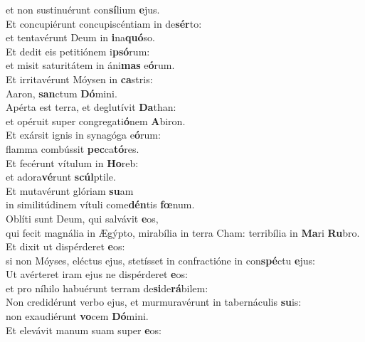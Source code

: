 \evenverse et non sustinuérunt con\textbf{sí}lium \textbf{e}jus.\\
\oddverse Et concupiérunt concupiscéntiam in de\textbf{sér}to:~\*\\
\oddverse et tentavérunt Deum in \textbf{i}na\textbf{quó}so.\\
\evenverse Et dedit eis petitiónem i\textbf{psó}rum:~\*\\
\evenverse et misit saturitátem in áni\textbf{mas} e\textbf{ó}rum.\\
\oddverse Et irritavérunt Móysen in \textbf{ca}stris:~\*\\
\oddverse Aaron, \textbf{san}ctum \textbf{Dó}mini.\\
\evenverse Apérta est terra, et deglutívit \textbf{Da}than:~\*\\
\evenverse et opéruit super congregati\textbf{ó}nem \textbf{A}biron.\\
\oddverse Et exársit ignis in synagóga e\textbf{ó}rum:~\*\\
\oddverse flamma combússit \textbf{pec}ca\textbf{tó}res.\\
\evenverse Et fecérunt vítulum in \textbf{Ho}reb:~\*\\
\evenverse et adora\textbf{vé}runt \textbf{scúl}ptile.\\
\oddverse Et mutavérunt glóriam \textbf{su}am~\*\\
\oddverse in similitúdinem vítuli come\textbf{dén}tis \textbf{fœ}num.\\
\evenverse Oblíti sunt Deum, qui salvávit \textbf{e}os,~\*\\
\evenverse qui fecit magnália in Ægýpto, mirabília in terra Cham: terribília in \textbf{Ma}ri \textbf{Ru}bro.\\
\oddverse Et dixit ut dispérderet \textbf{e}os:~\*\\
\oddverse si non Móyses, eléctus ejus, stetísset in confractióne in con\textbf{spé}ctu \textbf{e}jus:\\
\evenverse Ut avérteret iram ejus ne dispérderet \textbf{e}os:~\*\\
\evenverse et pro níhilo habuérunt terram de\textbf{si}de\textbf{rá}bilem:\\
\oddverse Non credidérunt verbo ejus, et murmuravérunt in tabernáculis \textbf{su}is:~\*\\
\oddverse non exaudiérunt \textbf{vo}cem \textbf{Dó}mini.\\
\evenverse Et elevávit manum suam super \textbf{e}os:~\*\\
